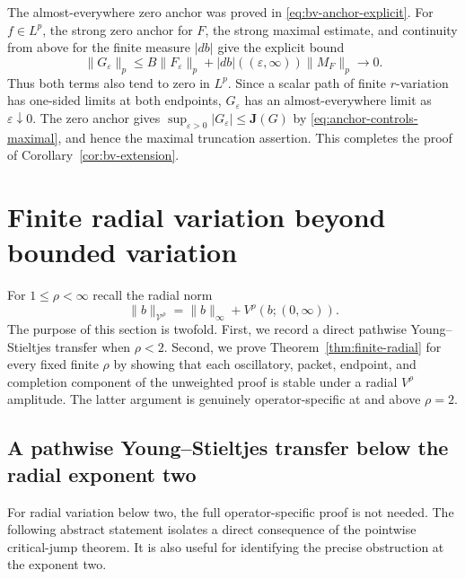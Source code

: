 \documentclass[11pt]{article}
\numberwithin{equation}{section}
\theoremstyle{remark}
\theoremstyle{definition}
\begin{document}
The almost-everywhere zero anchor was proved in
\eqref{eq:bv-anchor-explicit}.  For $f\in L^p$, the strong zero anchor for
$F$, the strong maximal estimate, and continuity from above for the finite
measure $|db|$ give the explicit bound
\[
 \|G_\varepsilon\|_p
 \le B\|F_\varepsilon\|_p
   +|db|((\varepsilon,\infty))\|M_F\|_p
 \longrightarrow0.
\]
Thus both terms also tend to zero in $L^p$.  Since a scalar path of finite $r$-variation has
one-sided limits at both endpoints, $G_\varepsilon$ has an almost-everywhere
limit as $\varepsilon\downarrow0$.  The zero anchor gives
$\sup_{\varepsilon>0}|G_\varepsilon|\le\mathbf J(G)$ by
\eqref{eq:anchor-controls-maximal}, and hence the maximal truncation
assertion.  This completes the proof of
Corollary~\ref{cor:bv-extension}.


\section{Finite radial variation beyond bounded variation}
\label{sec:finite-radial}

For $1\le\rho<\infty$ recall the radial norm
\[
 \|b\|_{\mathcal V^\rho}=\|b\|_\infty+V^\rho(b;(0,\infty)).
\]
The purpose of this section is twofold.  First, we record a direct pathwise
Young--Stieltjes transfer when $\rho<2$.  Second, we prove
Theorem~\ref{thm:finite-radial} for every fixed finite $\rho$ by showing that
each oscillatory, packet, endpoint, and completion component of the
unweighted proof is stable under a radial $V^\rho$ amplitude.  The latter
argument is genuinely operator-specific at and above $\rho=2$.


\subsection{A pathwise Young--Stieltjes transfer below the radial exponent two}

For radial variation below two, the full operator-specific proof is not
needed.  The following abstract statement isolates a direct consequence of
the pointwise critical-jump theorem.  It is also useful for identifying the
precise obstruction at the exponent two.
\end{document}
